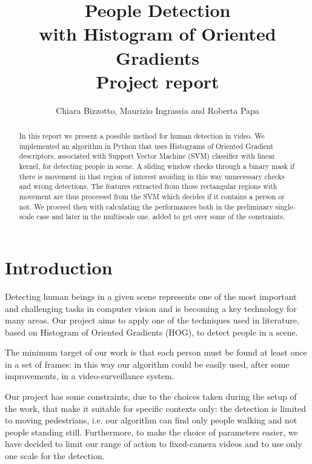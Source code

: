 \documentclass[a4paper, 10pt, onecolumn]{article} %
\begin{document}
\title{People Detection \\with Histogram of Oriented Gradients \\
\large Project report}
\author{Chiara Bizzotto, Maurizio Ingrassia and Roberta Papa}

\maketitle

\begin{abstract}
In this report we present a possible method for human detection in video. We implemented an algorithm in Python that uses Histograms of Oriented Gradient descriptors, associated with Support Vector Machine (SVM) classifier with linear kernel, for detecting people in scene. A sliding window checks through a binary mask if there is movement in that region of interest avoiding in this way unnecessary checks and wrong detections. The features extracted from those rectangular regions with movement are thus processed from the SVM which decides if it contains a person or not.
We proceed then with calculating the performances both in the preliminary single-scale case and later in the multiscale one, added to get over some of the constraints. 
\end{abstract}

\section{Introduction}
Detecting human beings in a given scene represents one of the most important and challenging tasks in computer vision and is becoming a key technology for many areas.
Our project aims to apply one of the techniques used in literature, based on Histogram of Oriented Gradients (HOG), to detect people in a scene. 

The minimum target of our work is that each person must be found at least once in a set of frames: in this way our algorithm could be easily used, after some improvements, in a video-surveillance system.

Our project has some constraints, due to the choices taken during the setup of the work, that make it suitable for specific contexts only: the detection is limited to moving pedestrians, i.e. our algorithm can find only people walking and not people standing still. Furthermore, to make the choice of parameters easier, we have decided to limit our range of action to fixed-camera videos and to use only one scale for the detection.
\end{document}
